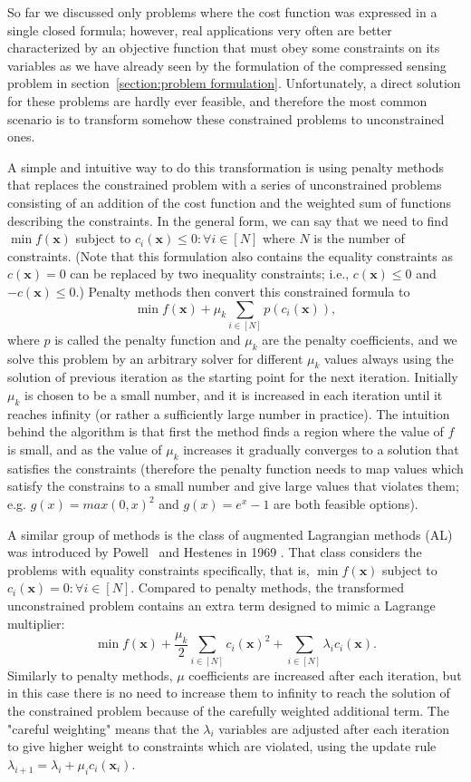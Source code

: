 So far we discussed only problems where the cost function was expressed in a single closed formula; however, real applications very often are better characterized by an objective function that must obey some constraints on its variables as we have already seen by the formulation of the compressed sensing problem in section~\ref{section:problem formulation}. Unfortunately, a direct solution for these problems are hardly ever feasible, and therefore the most common scenario is to transform somehow these constrained problems to unconstrained ones.

A simple and intuitive way to do this transformation is using penalty methods that replaces the constrained problem with a series of unconstrained problems consisting of an addition of the cost function and the weighted sum of functions describing the constraints. In the general form, we can say that we need to find $\min f(\mathbf{x})$ subject to $c_i(\mathbf{x}) \le 0 : \forall i \in [N]$ where $N$ is the number of constraints. (Note that this formulation also contains the equality constraints as $c(\mathbf{x}) = 0$ can be replaced by two inequality constraints; i.e., $c(\mathbf{x}) \le 0$ and $-c(\mathbf{x}) \le 0$.) Penalty methods then convert this constrained formula to
\[\min f(\mathbf{x}) + \mu_k \sum_{i \in [N]} p(c_i(\mathbf{x})),\]
where $p$ is called the penalty function and $\mu_k$ are the penalty coefficients, and we solve this problem by an arbitrary solver for different $\mu_k$ values always using the solution of previous iteration as the starting point for the next iteration. Initially $\mu_k$ is chosen to be a small number, and it is increased in each iteration until it reaches infinity (or rather a sufficiently large number in practice). The intuition behind the algorithm is that first the method finds a region where the value of $f$ is small, and as the value of $\mu_k$ increases it gradually converges to a solution that satisfies the constraints (therefore the penalty function needs to map values which satisfy the constrains to a small number and give large values that violates them; e.g. $g(x) = max(0, x)^2$ and $g(x) = e^x - 1$ are both feasible options).

A similar group of methods is the class of augmented Lagrangian methods (AL) was introduced by Powell~\cite{powell_method_1969} and Hestenes in 1969 \cite{hestenes_multiplier_1969}. That class considers the problems with equality constraints specifically, that is, $\min f(\mathbf{x})$ subject to $c_i(\mathbf{x}) = 0 : \forall i \in [N]$. Compared to penalty methods, the transformed unconstrained problem contains an extra term designed to mimic a Lagrange multiplier:
\[\min f(\mathbf{x}) + \frac{\mu_k}{2} \sum_{i \in [N]} c_i(\mathbf{x})^2 + \sum_{i \in [N]} \lambda_i c_i(\mathbf{x}).\]
Similarly to penalty methods, $\mu$ coefficients are increased after each iteration, but in this case there is no need to increase them to infinity to reach the solution of the constrained problem because of the carefully weighted additional term. The "careful weighting" means that the $\lambda_i$ variables are adjusted after each iteration to give higher weight to constraints which are violated, using the update rule $\lambda_{i+1} = \lambda_i + \mu_i c_i(\mathbf{x}_i)$.

